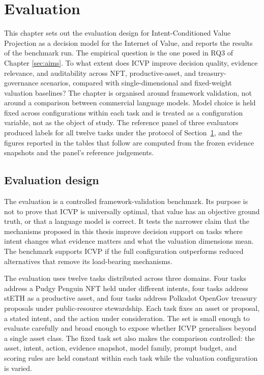 \section{Evaluation}
\label{sec:evaluation}

This chapter sets out the evaluation design for Intent-Conditioned Value Projection as a decision model for the Internet of Value, and reports the results of the benchmark run. The empirical question is the one posed in RQ3 of Chapter \ref{sec:aims}. To what extent does ICVP improve decision quality, evidence relevance, and auditability across NFT, productive-asset, and treasury-governance scenarios, compared with single-dimensional and fixed-weight valuation baselines? The chapter is organised around framework validation, not around a comparison between commercial language models. Model choice is held fixed across configurations within each task and is treated as a configuration variable, not as the object of study. The reference panel of three evaluators produced labels for all twelve tasks under the protocol of Section~\ref{sec:evaluation}, and the figures reported in the tables that follow are computed from the frozen evidence snapshots and the panel's reference judgements.

\subsection{Evaluation design}

The evaluation is a controlled framework-validation benchmark. Its purpose is not to prove that ICVP is universally optimal, that value has an objective ground truth, or that a language model is correct. It tests the narrower claim that the mechanisms proposed in this thesis improve decision support on tasks where intent changes what evidence matters and what the valuation dimensions mean. The benchmark supports ICVP if the full configuration outperforms reduced alternatives that remove its load-bearing mechanisms.

The evaluation uses twelve tasks distributed across three domains. Four tasks address a Pudgy Penguin NFT held under different intents, four tasks address stETH as a productive asset, and four tasks address Polkadot OpenGov treasury proposals under public-resource stewardship. Each task fixes an asset or proposal, a stated intent, and the action under consideration. The set is small enough to evaluate carefully and broad enough to expose whether ICVP generalises beyond a single asset class. The fixed task set also makes the comparison controlled: the asset, intent, action, evidence snapshot, model family, prompt budget, and scoring rules are held constant within each task while the valuation configuration is varied.

